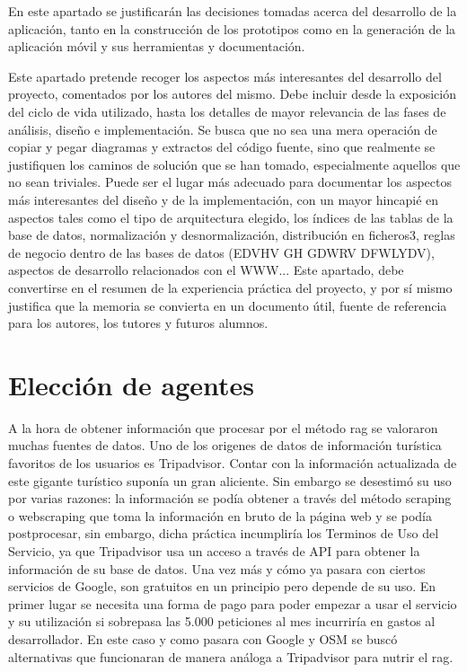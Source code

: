 
En este apartado se justificarán las decisiones tomadas acerca del desarrollo de la aplicación, tanto en la construcción de los prototipos como en la generación de la aplicación móvil y sus herramientas y documentación.

Este apartado pretende recoger los aspectos más interesantes del desarrollo del proyecto, comentados por los autores del mismo.
Debe incluir desde la exposición del ciclo de vida utilizado, hasta los detalles de mayor relevancia de las fases de análisis, diseño e implementación.
Se busca que no sea una mera operación de copiar y pegar diagramas y extractos del código fuente, sino que realmente se justifiquen los caminos de solución que se han tomado, especialmente aquellos que no sean triviales.
Puede ser el lugar más adecuado para documentar los aspectos más interesantes del diseño y de la implementación, con un mayor hincapié en aspectos tales como el tipo de arquitectura elegido, los índices de las tablas de la base de datos, normalización y desnormalización, distribución en ficheros3, reglas de negocio dentro de las bases de datos (EDVHV GH GDWRV DFWLYDV), aspectos de desarrollo relacionados con el WWW...
Este apartado, debe convertirse en el resumen de la experiencia práctica del proyecto, y por sí mismo justifica que la memoria se convierta en un documento útil, fuente de referencia para los autores, los tutores y futuros alumnos.

\section{Elección de agentes}
A la hora de obtener información que procesar por el método \acrshort{rag} se valoraron muchas fuentes de datos. Uno de los origenes de datos de información turística favoritos de los usuarios es Tripadvisor. Contar con la información actualizada de este gigante turístico suponía un gran aliciente. Sin embargo se desestimó su uso por varias razones: la información se podía obtener a través del método scraping o webscraping que toma la información en bruto de la página web y se podía postprocesar, sin embargo, dicha práctica incumpliría los Terminos de Uso del Servicio, ya que Tripadvisor usa un acceso a través de API para obtener la información de su base de datos. Una vez más y cómo ya pasara con ciertos servicios de Google, son gratuitos en un principio pero depende de su uso. En primer lugar se necesita una forma de pago para poder empezar a usar el servicio y su utilización si sobrepasa las 5.000 peticiones al mes incurriría en gastos al desarrollador. En este caso y como pasara con Google y OSM se buscó alternativas que funcionaran de manera análoga a Tripadvisor para nutrir el \acrshort{rag}.